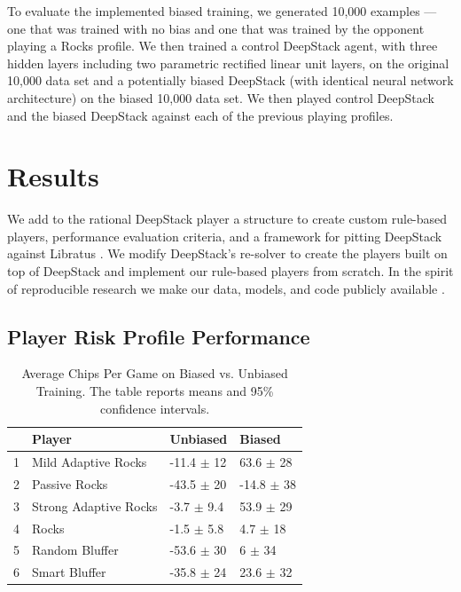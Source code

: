 \documentclass{article}
\begin{document}
\indent To evaluate the implemented biased training, we generated 10,000 examples --- one that was trained with no bias and one that was trained by the opponent playing a Rocks profile. We then trained a control DeepStack agent, with three hidden layers including two parametric rectified linear unit layers, on the original 10,000 data set and a potentially biased DeepStack (with identical neural network architecture) on the biased 10,000 data set. We then played control DeepStack and the biased DeepStack against each of the previous playing profiles.

\section{Results}

We add to the rational DeepStack player \cite{leducdeepstack} a structure to create custom rule-based players, performance evaluation criteria, and a framework for pitting DeepStack against Libratus \cite{coms4995f17}.  We modify DeepStack's re-solver to create the players built on top of DeepStack and implement our rule-based players from scratch. %
In the spirit of reproducible research we make our data, models, and code publicly available \cite{aridor19}.

\subsection{Player Risk Profile Performance}
\begin{table}
\centering
\begin{tabular}{rlll}
  \hline
 & Player & Unbiased & Biased \\ 
  \hline
  1 & Mild Adaptive Rocks & -11.4 $\pm$ 12 & 63.6 $\pm$ 28 \\ 
  2 & Passive Rocks & -43.5 $\pm$ 20 & -14.8 $\pm$ 38 \\ 
  3 & Strong Adaptive Rocks & -3.7 $\pm$ 9.4 & 53.9 $\pm$ 29 \\ 
  4 & Rocks & -1.5 $\pm$ 5.8 & 4.7 $\pm$ 18 \\ 
  5 & Random Bluffer & -53.6 $\pm$ 30 & 6 $\pm$ 34 \\ 
  6 & Smart Bluffer & -35.8 $\pm$ 24 & 23.6 $\pm$ 32 \\ 
   \hline
\end{tabular}
\caption{Average Chips Per Game on Biased vs. Unbiased Training. The table reports means and 95\% confidence intervals.}
\label{perf_results}
\end{table}
\end{document}
